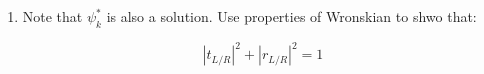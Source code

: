 \begin{mystexercise}
\begin{enumerate}
Similarily, for $\Pi_2$, $k<0$:

\begin{equation}
\begin{aligned}
\psi_k^R(x)=\begin{cases}
t_R(k)\exp(ikx)& x\in L \\
\exp(ikx) + r_R(k)\exp(-ikx) & x\in R
\end{cases}
\end{aligned}
\end{equation}


where $t, r$ denotes the \textit{transmission} and \textit{reflection} coefficient.


\item Note that $\psi_k^*$ is also a solution. Use properties of Wronskian to shwo that:

\begin{equation}
|t_{L/R}|^2 + |r_{L/R}|^2=1
\end{equation}
\end{enumerate}

\end{mystexercise}
